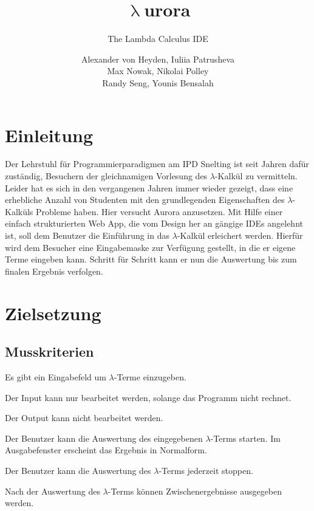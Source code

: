 \documentclass[parskip=full,11pt,twoside]{scrartcl}
\title{\textbf{$\uplambda$}urora}
\subtitle{The Lambda Calculus IDE}
\author{Alexander von Heyden, Iuliia Patrusheva\\
 Max Nowak, Nikolai Polley\\
 Randy Seng, Younis Bensalah}
\begin{document}
\maketitle
\newpage
\tableofcontents

\newpage
\section{Einleitung}
Der Lehrstuhl für Programmierparadigmen am IPD Snelting ist seit Jahren dafür zuständig, Besuchern der gleichnamigen Vorlesung des $\lambda$-Kalkül zu vermitteln. Leider hat es sich in den vergangenen Jahren immer wieder gezeigt, dass eine erhebliche Anzahl von Studenten mit den grundlegenden Eigenschaften des $\lambda$-Kalküls Probleme haben. Hier versucht Aurora anzusetzen. Mit Hilfe einer einfach strukturierten Web App, die vom Design her an gängige IDEs angelehnt ist, soll dem Benutzer die Einführung in das $\lambda$-Kalkül erleichert werden. Hierfür wird dem Besucher eine Eingabemaske zur Verfügung gestellt, in die er eigene Terme eingeben kann. Schritt für Schritt kann er nun die Auswertung bis zum finalen Ergebnis verfolgen.


\newpage
\section{Zielsetzung}

\subsection{Musskriterien}

Es gibt ein Eingabefeld um $\lambda$-Terme einzugeben.

Der Input kann nur bearbeitet werden, solange das Programm nicht rechnet.

Der Output kann nicht bearbeitet werden.

Der Benutzer kann die Auswertung des eingegebenen $\lambda$-Terms starten. Im Ausgabefenster erscheint das Ergebnis in Normalform.

Der Benutzer kann die Auswertung des $\lambda$-Terms jederzeit stoppen.

Nach der Auswertung des $\lambda$-Terms können Zwischenergebnisse ausgegeben werden.
\end{document}
